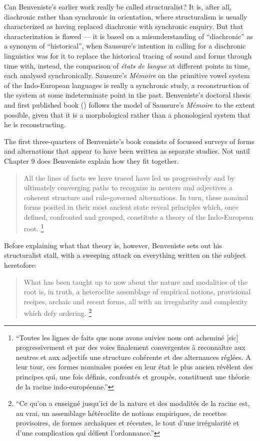 \documentclass[output=paper]{langscibook}
\begin{document}
Can Benveniste's earlier work really be called structuralist? It is, after all, diachronic rather than synchronic in orientation, where structuralism is usually characterized as having replaced diachronic with synchronic enquiry. But that characterization is flawed — it is based on a misunderstanding of ``diachronic'' as a synonym of ``historical'', when Saussure's intention in calling for a diachronic linguistics was for it to replace the historical tracing of sound and forms through time with, instead, the comparison of \emph{états de langue} at different points in time, each analysed synchronically. Saussure's \citeyear{Saussure1879} \emph{Mémoire} on the primitive vowel system of the Indo-European languages is really a synchronic study, a reconstruction of the system at some indeterminate point in the past. Benveniste's doctoral thesis and first published book (\citeyear{Benveniste1935}) follows the model of Saussure's \emph{Mémoire} to the extent possible, given that it is a morphological rather than a phonological system that he is reconstructing. 

The first three-quarters of Benveniste's book consists of focussed surveys of forms and alternations that appear to have been written as separate studies. Not until Chapter 9 does Benveniste explain how they fit together.

\begin{quotation}
All the lines of facts we have traced have led us progressively and by ultimately converging paths to recognize in neuters and adjectives a coherent structure and rule-governed alternations. In turn, these nominal forms posited in their most ancient state reveal principles which, once defined, confronted and grouped, constitute a theory of the Indo-European root. \citep[147]{Benveniste1935}\footnote{``Toutes les lignes de faits que nous avons suivies nous ont acheminé [sic] progressivement et par des voies finalement convergentes à reconnaître aux neutres et aux adjectifs une structure cohérente et des alternances réglées. A leur tour, ces formes nominales posées en leur état le plus ancien révèlent des principes qui, une fois définis, confrontés et groupés, constituent une théorie de la racine indo-européenne.''}
\end{quotation}

Before explaining what that theory is, however, Benveniste sets out his structuralist stall, with a sweeping attack on everything written on the subject heretofore:

\begin{quotation}
What has been taught up to now about the nature and modalities of the root is, in truth, a heteroclite assemblage of empirical notions, provisional recipes, archaic and recent forms, all with an irregularity and complexity which defy ordering. \citep[147]{Benveniste1935}\footnote{``Ce qu'on a enseigné jusqu'ici de la nature et des modalités de la racine est, au vrai, un assemblage hétéroclite de notions empiriques, de recettes provisoires, de formes archaïques et récentes, le tout d’une irrégularité et d’une complication qui défient l’ordonnance.''}
\end{quotation}
\end{document}
